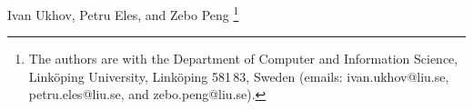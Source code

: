 Ivan Ukhov, Petru Eles, and Zebo Peng
\thanks{The authors are with the Department of Computer and Information Science,
Link\"{o}ping University, Link\"{o}ping 581\,83, Sweden (emails:
ivan.ukhov@liu.se, petru.eles@liu.se, and zebo.peng@liu.se).}%
